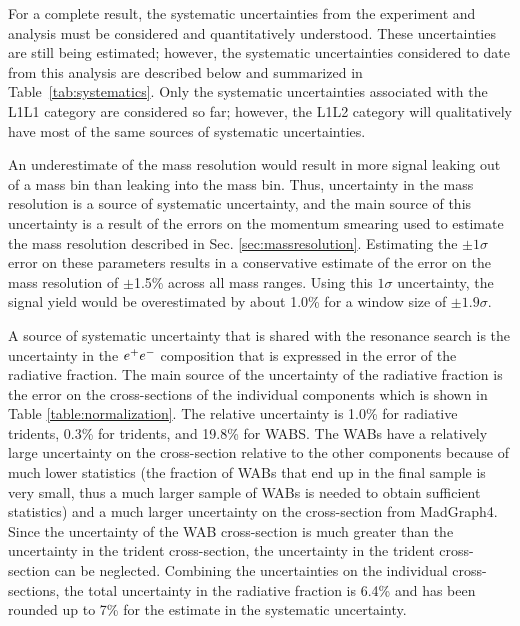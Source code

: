 For a complete result, the systematic uncertainties from the experiment and analysis must be considered and quantitatively understood. These uncertainties are still being estimated; however, the systematic uncertainties considered to date from this analysis are described below and summarized in Table~\ref{tab:systematics}. Only the systematic uncertainties associated with the L1L1 category are considered so far; however, the L1L2 category will qualitatively have most of the same sources of systematic uncertainties.


An underestimate of the mass resolution would result in more signal leaking out of a mass bin than leaking into the mass bin. Thus, uncertainty in the mass resolution is a source of systematic uncertainty, and the main source of this uncertainty is a result of the errors on the momentum smearing used to estimate the mass resolution described in Sec. \ref{sec:massresolution}. Estimating the $\pm 1\sigma$ error on these parameters results in a conservative estimate of the error on the mass resolution of $\pm$1.5\% across all mass ranges. Using this $1\sigma$ uncertainty, the signal yield would be overestimated by about 1.0\% for a window size of $\pm 1.9\sigma$.

A source of systematic uncertainty that is shared with the resonance search is the uncertainty in the $e^{+}e^{-}$ composition that is expressed in the error of the radiative fraction. The main source of the uncertainty of the radiative fraction is the error on the cross-sections of the individual components which is shown in Table \ref{table:normalization}. The relative uncertainty is 1.0\% for radiative tridents, 0.3\% for tridents, and 19.8\% for WABS. The WABs have a relatively large uncertainty on the cross-section relative to the other components because of much lower statistics (the fraction of WABs that end up in the final sample is very small, thus a much larger sample of WABs is needed to obtain sufficient statistics) and a much larger uncertainty on the cross-section from MadGraph4. Since the uncertainty of the WAB cross-section is much greater than the uncertainty in the trident cross-section, the uncertainty in the trident cross-section can be neglected. Combining the uncertainties on the individual cross-sections, the total uncertainty in the radiative fraction is 6.4\% and has been rounded up to 7\% for the estimate in the systematic uncertainty.

